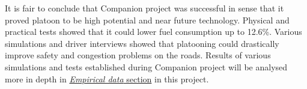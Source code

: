 % 
It is fair to conclude that Companion project was successful in sense that it proved platoon to be high potential and near future technology. Physical and practical tests showed that it could lower fuel consumption up to 12.6\%. Various simulations and driver interviews showed that platooning could drastically improve safety and congestion problems on the roads. Results of various simulations and tests established during Companion project will be analysed more in depth in \hyperref[sec:data]{\textit{Empirical data} section} in this project.
% 